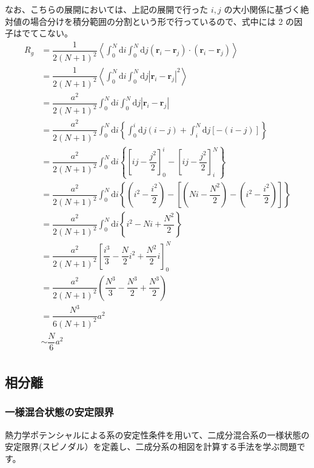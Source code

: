 \documentclass[uplatex,dvipdfmx,a4paper,11pt]{jsarticle}
\newcommand{\diff}{\mathrm d}
\begin{document}
なお、こちらの展開においては、上記の展開で行った $i , j$ の大小関係に基づく絶対値の場合分けを積分範囲の分割という形で行っているので、式中には 2 の因子はでてこない。
\begin{align*}
R_g 
	&= \dfrac{1}{2(N+1)^2} \left \langle \int_{0}^N \diff i \int_{0}^N \diff j (\bm{r}_i - \bm{r}_j) \cdot (\bm{r}_i - \bm{r}_j) \right \rangle\\
	&= \dfrac{1}{2(N+1)^2} \left \langle \int_{0}^N \diff i \int_{0}^{N} \diff j \left|\bm{r}_i - \bm{r}_j \right|^2 \right \rangle\\
	&= \dfrac{a^2}{2(N+1)^2} \int_{0}^N \diff i \int_{0}^{N} \diff j \left|\bm{r}_i - \bm{r}_j \right| \\
	&= \dfrac{a^2}{2(N+1)^2} \int_{0}^N \diff i \left\{ \int_{0}^{i} \diff j (i -j) + \int_i^N \diff j \left[ -(i-j) \right] \right\} \\
	&= \dfrac{a^2}{2(N+1)^2} \int_{0}^N \diff i \left\{ \left [ij - \dfrac{j^2}{2} \right]_0^i - \left[ ij - \dfrac{j^2}{2} \right]_i^N \right\} \\
	&= \dfrac{a^2}{2(N+1)^2} \int_{0}^N \diff i \left\{ \left (i^2 - \dfrac{i^2}{2} \right) - \left[ \left(Ni - \dfrac{N^2}{2} \right) - \left (i^2 - \dfrac{i^2}{2} \right) \right] \right\} \\
	&= \dfrac{a^2}{2(N+1)^2} \int_{0}^N \diff i \left\{ i^2 - Ni + \dfrac{N^2}{2} \right\} \\
	&= \dfrac{a^2}{2(N+1)^2} \left[ \dfrac{i^3}{3} - \dfrac{N}{2}i^2 + \dfrac{N^2}{2} i \right]_0^N \\
	&= \dfrac{a^2}{2(N+1)^2} \left( \dfrac{N^3}{3} - \dfrac{N^3}{2} + \dfrac{N^3}{2} \right) \\
	&= \dfrac{N^3 }{6(N+1)^2} a^2\\
	&\sim \dfrac{N}{6} a^2\\
\end{align*}

\color{black}

\newpage

\subsection{相分離}

\subsubsection{一様混合状態の安定限界}

\begin{boxnote}
熱力学ポテンシャルによる系の安定性条件を用いて、二成分混合系の一様状態の安定限界(スピノダル）を定義し、二成分系の相図を計算する手法を学ぶ問題です。

\end{boxnote}
\end{document}
